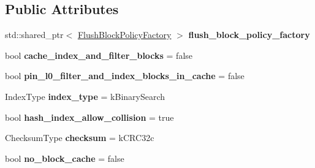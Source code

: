 \subsection*{Public Attributes}
\begin{DoxyCompactItemize}
\item 
std\+::shared\+\_\+ptr$<$ \hyperlink{classrocksdb_1_1FlushBlockPolicyFactory}{Flush\+Block\+Policy\+Factory} $>$ {\bfseries flush\+\_\+block\+\_\+policy\+\_\+factory}\hypertarget{structrocksdb_1_1BlockBasedTableOptions_ad73f8618a8e2f822a898b6b50351208a}{}\label{structrocksdb_1_1BlockBasedTableOptions_ad73f8618a8e2f822a898b6b50351208a}

\item 
bool {\bfseries cache\+\_\+index\+\_\+and\+\_\+filter\+\_\+blocks} = false\hypertarget{structrocksdb_1_1BlockBasedTableOptions_a9b47fc5e2871d2928b6b4c6bffe6017c}{}\label{structrocksdb_1_1BlockBasedTableOptions_a9b47fc5e2871d2928b6b4c6bffe6017c}

\item 
bool {\bfseries pin\+\_\+l0\+\_\+filter\+\_\+and\+\_\+index\+\_\+blocks\+\_\+in\+\_\+cache} = false\hypertarget{structrocksdb_1_1BlockBasedTableOptions_ac711b41f7055cdae0e3554b57bfe114f}{}\label{structrocksdb_1_1BlockBasedTableOptions_ac711b41f7055cdae0e3554b57bfe114f}

\item 
Index\+Type {\bfseries index\+\_\+type} = k\+Binary\+Search\hypertarget{structrocksdb_1_1BlockBasedTableOptions_ae00971fc952135fe87df4f9f041e5289}{}\label{structrocksdb_1_1BlockBasedTableOptions_ae00971fc952135fe87df4f9f041e5289}

\item 
bool {\bfseries hash\+\_\+index\+\_\+allow\+\_\+collision} = true\hypertarget{structrocksdb_1_1BlockBasedTableOptions_a1404fa6a494624d4dca4038e06312003}{}\label{structrocksdb_1_1BlockBasedTableOptions_a1404fa6a494624d4dca4038e06312003}

\item 
Checksum\+Type {\bfseries checksum} = k\+C\+R\+C32c\hypertarget{structrocksdb_1_1BlockBasedTableOptions_a1adc5994a69a8cd0e1647148d0c2f752}{}\label{structrocksdb_1_1BlockBasedTableOptions_a1adc5994a69a8cd0e1647148d0c2f752}

\item 
bool {\bfseries no\+\_\+block\+\_\+cache} = false\hypertarget{structrocksdb_1_1BlockBasedTableOptions_ae3a1448054303148e9c1d73c0d3a8149}{}\label{structrocksdb_1_1BlockBasedTableOptions_ae3a1448054303148e9c1d73c0d3a8149}


\end{DoxyCompactItemize}
